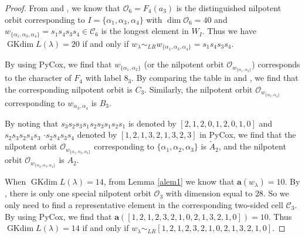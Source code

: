 \documentclass[reqno,12pt]{amsart}
\numberwithin{equation}{section}
\theoremstyle{plain}
\theoremstyle{definition}
\newcommand{\lam}{\lambda}
\newcommand{\aff}{ \mathbf{a} }
\newcommand{\gkd}{\operatorname{GKdim}}
\begin{document}
\begin{proof}
From \cite{BC76} and \cite[\S 8.4]{CM}, we know that $\mathcal{O}_{6}=F_4(a_3)$ is the distinguished nilpotent orbit corresponding to $I=\{\alpha_1,\alpha_3,\alpha_4\}$  with $\dim \mathcal{O}_{6}=40$ and $w_{\{\alpha_1,\alpha_3,\alpha_4\}}=s_{1}s_{4}s_{3}s_{4}\in \mathcal{C}_6$ is the longest element in $W_{I}$. Thus we have $\gkd L(\lambda)=20$ if and only if $w_{\lambda}\sim_{LR} w_{\{\alpha_1,\alpha_3,\alpha_4\}}=s_{1}s_{4}s_{3}s_{4}$.



By using PyCox, we find that $w_{\{\alpha_1,\alpha_2\}}$ (or the nilpotent orbit $\mathcal{O}_{w_{\{\alpha_1,\alpha_2\}}}$) corresponds to the character of $F_4$ with label $8_3$. By comparing the table in \cite[Table C.3]{GP}
and \cite[p. 428]{Ca85}, we find that the corresponding nilpotent orbit is $C_3$. Similarly, the  nilpotent orbit $\mathcal{O}_{w_{\{\alpha_3,\alpha_4\}}}$ corresponding to $w_{\alpha_3, \alpha_4}$ is $B_3$.

By noting that $s_3s_{2}s_{3}s_{1}s_{2}s_{3}s_{1}s_{2}s_{1}$ is denoted by $[2,1,2,0,1,2,0,1,0]$ and $s_{2}s_{3}s_{2}s_{4}s_{3}$ $
\cdot s_{2}s_{4}s_{3}s_{4}$ denoted by $[1,2,1,3,2,1,3,2,3]$ in PyCox, we find that the nilpotent orbit $\mathcal{O}_{w_{\{\alpha_1,\alpha_2,\alpha_3\}}}$ corresponding to $\{\alpha_1, \alpha_2, \alpha_3\}$ is $\tilde{A}_2$, and the  nilpotent orbit $\mathcal{O}_{w_{\{\alpha_2,\alpha_3,\alpha_4\}}}$ is $A_2$.

When $\gkd L(\lam)=14$, from Lemma \ref{alem1} we know that $\aff(w_{\lam})=10$. By \cite[Table in page 128]{CM}, there is only one special nilpotent orbit $\mathcal{O}_3$ with dimension equal to $28$. So we only need to find a representative element in the corresponding two-sided cell $\mathcal{C}_3$.
By using PyCox, we find that $\aff([1, 2, 1, 2, 3, 2, 1, 0, 2, 1, 3, 2, 1, 0])=10$. Thus $\gkd L(\lam)=14$ if and only if $w_{\lambda}\sim_{LR}[1, 2, 1, 2, 3, 2, 1, 0, 2, 1, 3, 2, 1, 0]$.
\end{proof}
\end{document}
